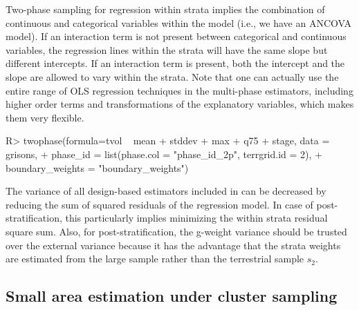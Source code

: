 Two-phase sampling for regression within strata implies the combination of continuous and categorical variables within the model (i.e., we have an ANCOVA model). If an interaction term is not present between categorical and continuous variables, the regression lines within the strata will have the same slope but different intercepts. If an interaction term is present, both the intercept and the slope are allowed to vary within the strata. Note that one can actually use the entire range of OLS regression techniques in the multi-phase estimators, including higher order terms and transformations of the explanatory variables, which makes them very flexible.

\begin{small}
\begin{Schunk}
\begin{Sinput}
R> twophase(formula=tvol ~ mean + stddev + max + q75 + stage, data = grisons,
+    phase_id = list(phase.col = "phase_id_2p", terrgrid.id = 2),
+    boundary_weights = "boundary_weights")
\end{Sinput}
\end{Schunk}
\end{small}

The variance of all design-based estimators included in  can be decreased by reducing the sum of squared residuals of the regression model. In case of post-stratification, this particularly implies minimizing the within strata residual square sum. Also, for post-stratification, the g-weight variance should be trusted over the external variance because it has the advantage that the strata weights are estimated from the large sample rather than the terrestrial sample $s_2$.

\subsection{Small area estimation under cluster sampling}

